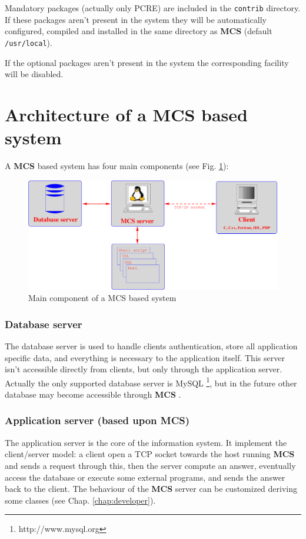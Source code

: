 \documentclass[12pt,titlepage]{book}
\newcommand{\mcs}{\textbf{MCS} }
\begin{document}
\noindent Mandatory packages (actually only PCRE) are included in the
\verb|contrib| directory. If these packages aren't present in the
system they will be automatically configured, compiled and installed
in the same directory as \mcs (default \verb|/usr/local|).

\bigskip

\noindent If the optional packages aren't present in the system the
corresponding facility will be disabled.


\section{Architecture of a MCS based system}
\label{sec:architecture}
A \mcs based system has four main components (see
Fig. \ref{fig:maincomponents}):

%
\begin{figure}[hbtp]
\begin{center}
\includegraphics[width=14cm,keepaspectratio]{includes/diaggen}
\end{center}
\caption{Main component of a MCS based system}
\label{fig:maincomponents}
\end{figure}
%

\subsubsection{Database server}
The database server is used to handle clients authentication, store
all application specific data, and everything is necessary to the
application itself. This server isn't accessible directly from
clients, but only through the application server. Actually the only
supported database server is MySQL \footnote{http://www.mysql.org},
but in the future other database may become accessible through \mcs.

\subsubsection{Application server (based upon MCS)}
The application server is the core of the information system. It
implement the client/server model: a client open a TCP socket towards
the host running \mcs and sends a request through this, then the
server compute an answer, eventually access the database or execute
some external programs, and sends the answer back to the client. The
behaviour of the \mcs server can be customized deriving some classes
(see Chap. \ref{chap:developer}).
\end{document}
